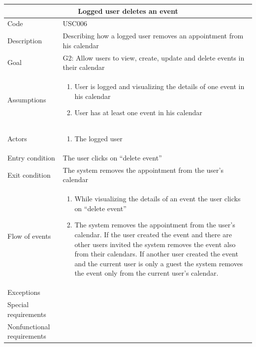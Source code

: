 \documentclass[10pt,a4paper,titlepage]{article}
\begin{document}
\begin{tabular}[h]{| p{3cm} | p{10cm} |}
\hline \multicolumn{2}{|c|}{\textbf{Logged user deletes an event}} \\ 
\hline Code & USC006 \\ 
\hline Description & Describing how a logged user removes an appointment from his calendar \\
\hline Goal & G2: Allow users to view, create, update and delete events in their calendar\\
\hline Assumptions  & \begin{enumerate}
\item User is logged and visualizing the details of one event in his calendar
\item User has at least one event in his calendar
\end{enumerate} \\
\hline Actors &  \begin{enumerate}
\item The logged user
\end{enumerate} \\
\hline Entry condition & The user clicks on “delete event” \\
\hline Exit condition & The system removes the appointment from the user’s calendar \\
\hline Flow of events & \begin{enumerate}
\item While visualizing the details of an event the user clicks on “delete event”
\item The system removes the appointment from the user’s calendar. If the user created the event and there are other users invited the system removes the event also from their calendars. If another user created the event and the current user is only a guest the system removes the event only from the current user’s calendar.
\end{enumerate}\\
\hline Exceptions & \\
\hline Special requirements & \\
\hline Nonfunctional requirements & \\
\hline
\end{tabular}
\end{document}
